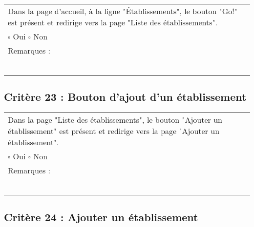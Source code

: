 	\begin{center}
    	 		\begin{tabular}[h]{|p{}|}
			\hline
				Dans la page d'accueil, à la ligne "Établissements", le bouton "Go!" est présent et redirige vers la page "Liste des établissements".\\
				$\square$ Oui  \hfill \hfill $\square$ Non \\\hline Remarques : \\ ~\\
			 \\\hline
     		\end{tabular}
  		\end{center}	
  		
  		
  	\subsection*{Critère 23 : Bouton d'ajout d'un établissement}
	
	\begin{center}
    	 		\begin{tabular}[h]{|p{}|}
			\hline
				Dans la page "Liste des établissements", le bouton "Ajouter un établissement" est présent et redirige vers la page "Ajouter un établissement".\\
				$\square$ Oui  \hfill \hfill $\square$ Non \\\hline Remarques : \\ ~\\
			 \\\hline
     		\end{tabular}
  		\end{center}	
  		
  		
  	\subsection*{Critère 24 : Ajouter un établissement}
	
